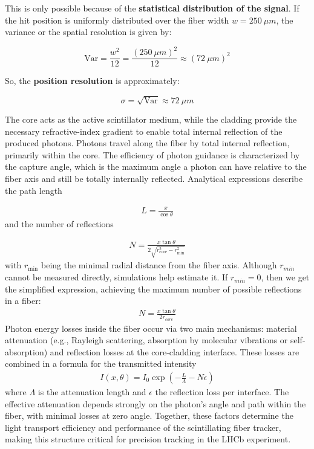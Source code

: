     \begin{tcolorbox}[colback=green!5!white,
                  colframe=green!60!black,
                  coltitle=white,
                  fontupper=\bfseries]
    
    This is only possible because of the \textbf{statistical distribution of the signal}. If the hit position is uniformly distributed over the fiber width \( w = 250~\mu m \), the variance or the spatial resolution is given by:

    \[
    \text{Var} = \frac{w^2}{12} = \frac{(250~\mu m)^2}{12} \approx (72~\mu m)^2
    \]

    So, the \textbf{position resolution} is approximately:

    \[
    \sigma = \sqrt{\text{Var}} \approx 72~\mu m
    \]
    
    \end{tcolorbox}

    
    The core acts as the active scintillator medium, while the cladding provide the necessary refractive-index gradient to enable total internal reflection of the produced photons. Photons travel along the fiber by total internal reflection, primarily within the core. The efficiency of photon guidance is characterized by the capture angle, which is the maximum angle a photon can have relative to the fiber axis and still be totally internally reflected. Analytical expressions describe the path length 
    
    \begin{align}
        L = \frac{x}{\cos \theta}
    \end{align}
     and the number of reflections 
     
     \begin{align}
         N = \frac{x \tan \theta}{2\sqrt{r_{\text{core}}^2 - r_{\text{min}}^2}}
     \end{align} 
     with \(r_{\text{min}}\) being the minimal radial distance from the fiber axis. Although $r_{min}$ cannot be measured directly, simulations help estimate it. If $r_{min}=0$, then we get the simplified expression, achieving the maximum number of possible reflections in a fiber: 
     \begin{align}
         N = \frac{x \tan \theta}{2 r_{core}}
     \end{align}
    Photon energy losses inside the fiber occur via two main mechanisms: material attenuation (e.g., Rayleigh scattering, absorption by molecular vibrations or self-absorption) and reflection losses at the core-cladding interface. These losses are combined in a formula for the transmitted intensity 
    \begin{align}
        I(x, \theta) = I_0 \exp\left(-\frac{L}{\Lambda} - N \epsilon\right)
    \end{align} where $\Lambda$ is the attenuation length and $\epsilon$ the reflection loss per interface. The effective attenuation depends strongly on the photon's angle and path within the fiber, with minimal losses at zero angle. Together, these factors determine the light transport efficiency and performance of the scintillating fiber tracker, making this structure critical for precision tracking in the LHCb experiment.
    